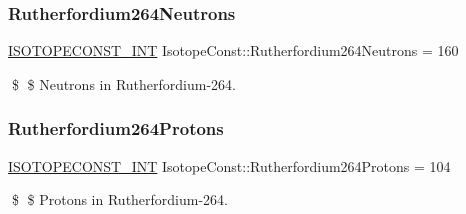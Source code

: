 \subsubsection{\texorpdfstring{Rutherfordium264\+Neutrons}{Rutherfordium264Neutrons}}
{\footnotesize\ttfamily \mbox{\hyperlink{group___isotope_const-_macros_ga5f18360b3e99483a35c32d789e62621c}{I\+S\+O\+T\+O\+P\+E\+C\+O\+N\+S\+T\+\_\+\+I\+NT}} Isotope\+Const\+::\+Rutherfordium264\+Neutrons = 160}

\$ \$ Neutrons in Rutherfordium-\/264. \mbox{\label{group___isotope_const-_rutherfordium-_rf264_gada3a7b124c285e527fda6a76f1da63d6}} 
\subsubsection{\texorpdfstring{Rutherfordium264\+Protons}{Rutherfordium264Protons}}
{\footnotesize\ttfamily \mbox{\hyperlink{group___isotope_const-_macros_ga5f18360b3e99483a35c32d789e62621c}{I\+S\+O\+T\+O\+P\+E\+C\+O\+N\+S\+T\+\_\+\+I\+NT}} Isotope\+Const\+::\+Rutherfordium264\+Protons = 104}

\$ \$ Protons in Rutherfordium-\/264. 
